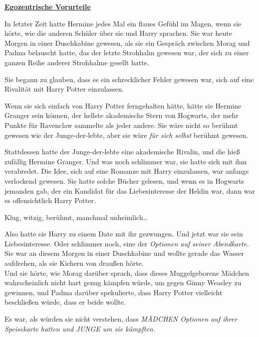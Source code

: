 

\hypertarget{egozentrische-vorurteile}{%

\textbf{\uline{Egozentrische Vorurteile}}

In letzter Zeit hatte Hermine jedes Mal ein flaues Gefühl im Magen, wenn sie hörte, wie die anderen Schüler über sie und Harry sprachen. Sie war heute Morgen in einer Duschkabine gewesen, als sie ein Gespräch zwischen Morag und Padma belauscht hatte, das der letzte Strohhalm gewesen war, der sich zu einer ganzen Reihe anderer Strohhalme gesellt hatte.

Sie begann zu glauben, dass es ein schrecklicher Fehler gewesen war, sich auf eine Rivalität mit Harry Potter einzulassen.

Wenn sie sich einfach von Harry Potter ferngehalten hätte, hätte sie Hermine Granger sein können, der hellste akademische Stern von Hogwarts, der mehr Punkte für Ravenclaw sammelte als jeder andere. Sie wäre nicht so berühmt gewesen wie der Junge-der-lebte, aber sie wäre \emph{für sich selbst} berühmt gewesen.

Stattdessen hatte der Junge-der-lebte eine akademische Rivalin, und die hieß zufällig Hermine Granger. Und was noch schlimmer war, sie hatte sich mit ihm verabredet. Die Idee, sich auf eine Romanze mit Harry einzulassen, war anfangs verlockend gewesen. Sie hatte solche Bücher gelesen, und wenn es in Hogwarts jemanden gab, der ein Kandidat für das Liebesinteresse der Heldin war, dann war es offensichtlich Harry Potter.

Klug, witzig, berühmt, manchmal unheimlich…

Also hatte sie Harry zu einem Date mit ihr gezwungen. Und jetzt war sie sein Liebesinteresse. Oder schlimmer noch, eine der \emph{Optionen auf seiner Abendkarte.}\\ Sie war an diesem Morgen in einer Duschkabine und wollte gerade das Wasser aufdrehen, als sie Kichern von draußen hörte.\\ Und sie hörte, wie Morag darüber sprach, dass dieses Muggelgeborene Mädchen wahrscheinlich nicht hart genug kämpfen würde, um gegen Ginny Weasley zu gewinnen, und Padma darüber spekulierte, dass Harry Potter vielleicht beschließen würde, dass er beide wollte.

Es war, als würden sie nicht verstehen, dass \emph{MÄDCHEN Optionen auf ihrer Speisekarte hatten und JUNGE um sie kämpften.}

}
